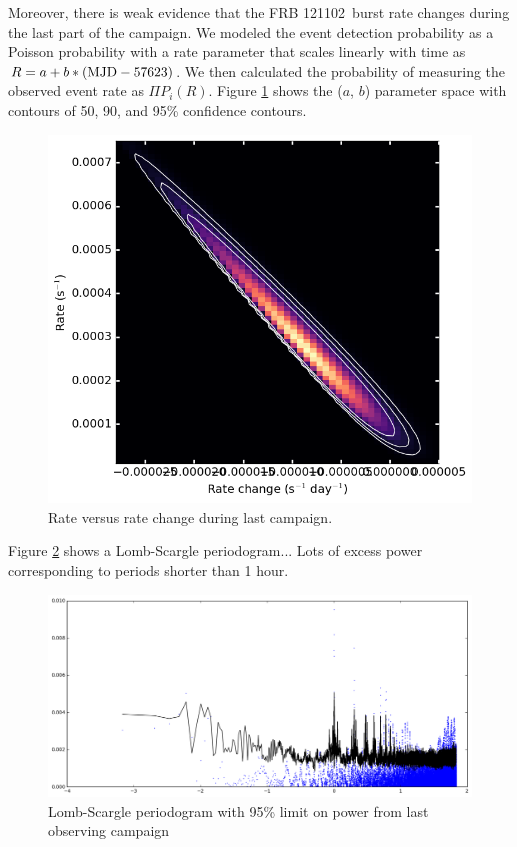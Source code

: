 \documentclass{emulateapj}
\newcommand{\frb}{FRB 121102}
\begin{document}
Moreover, there is weak evidence that the \frb\ burst rate changes during the last part of the campaign. We modeled the event detection probability as a Poisson probability with a rate parameter that scales linearly with time as $R=a + b*(\rm{MJD} - 57623)$. We then calculated the probability of measuring the observed event rate as $\Pi P_i(R)$. Figure \ref{fig:rate} shows the ($a$, $b$) parameter space with contours of 50, 90, and 95\% confidence contours. 

\begin{figure}[htb]
\begin{center}
\includegraphics[width=0.9\columnwidth]{event_rate_contours}
\caption{Rate versus rate change during last campaign.
\label{fig:rate}}
\end{center}
\end{figure}

Figure \ref{fig:ls} shows a Lomb-Scargle periodogram...
Lots of excess power corresponding to periods shorter than 1 hour.

\begin{figure}[htb]
\begin{center}
\includegraphics[width=0.9\columnwidth]{lombscargle}
\caption{Lomb-Scargle periodogram with 95\% limit on power from last observing campaign
\label{fig:ls}}
\end{center}
\end{figure}
\end{document}
